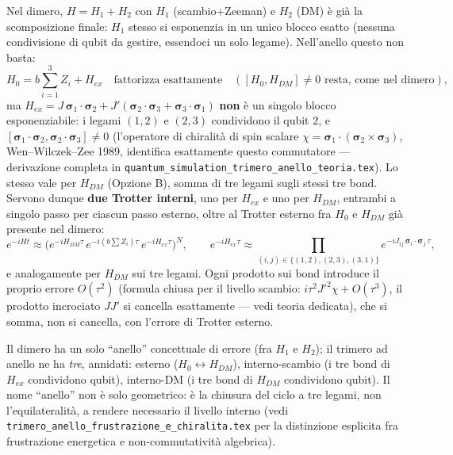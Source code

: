 \documentclass[11pt,a4paper]{article}
\begin{document}
Nel dimero, $H=H_1+H_2$ con $H_1$ (scambio+Zeeman) e $H_2$ (DM) è già la scomposizione finale:
$H_1$ stesso si esponenzia in un unico blocco esatto (nessuna condivisione di qubit da gestire,
essendoci un solo legame). Nell'anello questo non basta:
\begin{equation}
H_0=b\!\sum_{i=1}^3 Z_i+H_{ex}\quad\text{fattorizza esattamente}\quad([H_0,H_{DM}]\neq0\text{ resta,
come nel dimero}),
\end{equation}
ma $H_{ex}=J\,\boldsymbol\sigma_1\!\cdot\!\boldsymbol\sigma_2+J'(\boldsymbol\sigma_2\!\cdot\!\boldsymbol\sigma_3+\boldsymbol\sigma_3\!\cdot\!\boldsymbol\sigma_1)$
\textbf{non} è un singolo blocco esponenziabile: i legami $(1,2)$ e $(2,3)$ condividono il qubit
$2$, e $[\boldsymbol\sigma_1\!\cdot\!\boldsymbol\sigma_2,\boldsymbol\sigma_2\!\cdot\!\boldsymbol\sigma_3]\neq0$
(l'operatore di chiralità di spin scalare
$\chi=\boldsymbol\sigma_1\!\cdot\!(\boldsymbol\sigma_2\times\boldsymbol\sigma_3)$,
Wen--Wilczek--Zee 1989, identifica esattamente questo commutatore --- derivazione completa in
\texttt{quantum\_simulation\_trimero\_anello\_teoria.tex}). Lo stesso vale per $H_{DM}$ (Opzione
B), somma di tre legami sugli stessi tre bond. Servono dunque \textbf{due Trotter interni},
uno per $H_{ex}$ e uno per $H_{DM}$, entrambi a singolo passo per ciascun passo esterno, oltre al
Trotter esterno fra $H_0$ e $H_{DM}$ già presente nel dimero:
\begin{equation}
e^{-iHt}\approx\Big(e^{-iH_{DM}\tau}\,e^{-i(b\sum Z_i)\tau}\,e^{-iH_{ex}\tau}\Big)^N,
\qquad
e^{-iH_{ex}\tau}\approx\!\!\prod_{(i,j)\in\{(1,2),(2,3),(3,1)\}}\!\!e^{-iJ_{ij}\,\boldsymbol\sigma_i\cdot\boldsymbol\sigma_j\,\tau},
\end{equation}
e analogamente per $H_{DM}$ sui tre legami. Ogni prodotto sui bond introduce il proprio errore
$O(\tau^2)$ (formula chiusa per il livello scambio: $i\tau^2J'^2\chi+O(\tau^3)$, il prodotto
incrociato $JJ'$ si cancella esattamente --- vedi teoria dedicata), che si somma, non si
cancella, con l'errore di Trotter esterno.

\begin{ideabox}
Il dimero ha un solo ``anello'' concettuale di errore (fra $H_1$ e $H_2$); il trimero ad anello
ne ha \emph{tre}, annidati: esterno ($H_0\leftrightarrow H_{DM}$), interno-scambio (i tre bond di
$H_{ex}$ condividono qubit), interno-DM (i tre bond di $H_{DM}$ condividono qubit). Il nome
``anello'' non è solo geometrico: è la chiusura del ciclo a tre legami, non l'equilateralità, a
rendere necessario il livello interno (vedi \texttt{trimero\_anello\_frustrazione\_e\_chiralita.tex}
per la distinzione esplicita fra frustrazione energetica e non-commutatività algebrica).
\end{ideabox}
\end{document}
